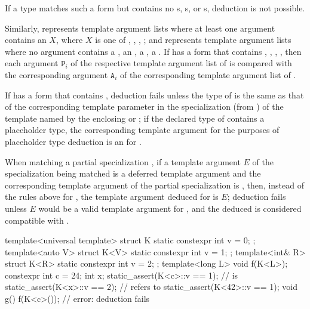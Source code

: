\documentclass{wg21}
\begin{document}
\begin{note}
    If a type matches such a form but contains no
    s, s, or s, deduction is not possible.
\end{note}
Similarly,
 represents template argument lists where
at least one argument contains an $X$, where
$X$ is one of , , ,  ;
and
\tcode{<>}
represents template argument lists where no argument contains a
, an , a ,  a .
\pnum
If  has a form that contains
, , ,  ,
then each argument $\mathtt{P}_i$ of the
respective template argument list of  is compared with the
corresponding argument $\mathtt{A}_i$ of the corresponding
template argument list of .


\ednote{[...]}

\pnum
If  has a form that contains ,
deduction fails unless the type of  is the same as that
of the corresponding template parameter
 in the specialization (from )
of the template named by the enclosing  or
;
if the declared type of  contains a placeholder type,
the corresponding template argument for the purposes of
placeholder type deduction 
is an  for .

\ednote{[...]}


\begin{addedblock}
\pnum
When matching a partial specialization ,
if a template argument $E$ of the specialization being matched
is a deferred template argument  and
the corresponding template argument of the partial specialization
is ,
then, instead of the rules above for ,
the template argument deduced for  is $E$;
deduction fails unless $E$ would be a valid template argument for  ,
and the deduced  is considered compatible with .
\begin{example}
\begin{codeblock}
    template<universal template> struct K { static constexpr int v = 0; };
    template<auto V> struct K<V> { static constexpr int v = 1; };
    template<int& R> struct K<R> { static constexpr int v = 2; };
    template<long L> void f(K<L>);
    constexpr int c = 24;
    int x;
    static_assert(K<c>::v == 1);    //  is 
    static_assert(K<x>::v == 2);    //  refers to 
    static_assert(K<42>::v == 1);
    void g() {
        f(K<c>());                    // error: deduction fails
    }
\end{codeblock}
\end{example}
\end{addedblock}
\end{document}
